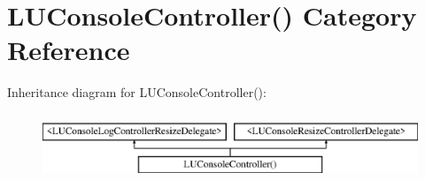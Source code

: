 \hypertarget{category_l_u_console_controller_07_08}{}\section{L\+U\+Console\+Controller() Category Reference}
\label{category_l_u_console_controller_07_08}
Inheritance diagram for L\+U\+Console\+Controller()\+:\begin{figure}[H]
\begin{center}
\leavevmode
\includegraphics[height=2.000000cm]{category_l_u_console_controller_07_08}
\end{center}
\end{figure}
